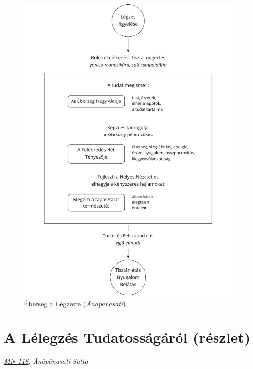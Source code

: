 \clearpage
\figurepagelayout

\begin{figure}[h]
\caption{Éberség a Légzésre (\emph{Ānāpānasati})}\label{fig-mindfulness-of-breathing}
\bigskip
\includegraphics[width=\linewidth]{./manuscript/tex/diagrams/mindfulness-of-breathing-hu.pdf}
\end{figure}

\clearpage
\normalpagelayout

\section{A Lélegzés Tudatosságáról (részlet)}

{\centering
\emph{\href{https://a-buddha-ujja.hu/mn-118/hu/farkas-pal}{MN 118}, Ānāpānasati Sutta}
\par}


